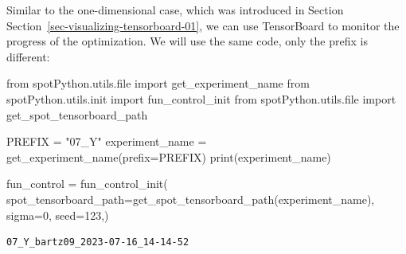 \documentclass[
  letterpaper,
  DIV=11,
  numbers=noendperiod]{scrreprt}
\newenvironment{Shaded}{\begin{snugshade}}{\end{snugshade}}
\newcommand{\BuiltInTok}[1]{\textcolor[rgb]{0.00,0.23,0.31}{#1}}
\newcommand{\DecValTok}[1]{\textcolor[rgb]{0.68,0.00,0.00}{#1}}
\newcommand{\ImportTok}[1]{\textcolor[rgb]{0.00,0.46,0.62}{#1}}
\newcommand{\NormalTok}[1]{\textcolor[rgb]{0.00,0.23,0.31}{#1}}
\newcommand{\OperatorTok}[1]{\textcolor[rgb]{0.37,0.37,0.37}{#1}}
\newcommand{\StringTok}[1]{\textcolor[rgb]{0.13,0.47,0.30}{#1}}
\begin{document}
\begin{tcolorbox}[enhanced jigsaw, titlerule=0mm, colbacktitle=quarto-callout-note-color!10!white, coltitle=black, arc=.35mm, toptitle=1mm, colback=white, left=2mm, opacityback=0, bottomtitle=1mm, bottomrule=.15mm, breakable, opacitybacktitle=0.6, colframe=quarto-callout-note-color-frame, rightrule=.15mm, toprule=.15mm, leftrule=.75mm, title=\textcolor{quarto-callout-note-color}{\faInfo}\hspace{0.5em}{TensorBoard}]

Similar to the one-dimensional case, which was introduced in Section
Section~\ref{sec-visualizing-tensorboard-01}, we can use TensorBoard to
monitor the progress of the optimization. We will use the same code,
only the prefix is different:

\begin{Shaded}
\begin{Highlighting}[]
\ImportTok{from}\NormalTok{ spotPython.utils.}\BuiltInTok{file} \ImportTok{import}\NormalTok{ get\_experiment\_name}
\ImportTok{from}\NormalTok{ spotPython.utils.init }\ImportTok{import}\NormalTok{ fun\_control\_init}
\ImportTok{from}\NormalTok{ spotPython.utils.}\BuiltInTok{file} \ImportTok{import}\NormalTok{ get\_spot\_tensorboard\_path}

\NormalTok{PREFIX }\OperatorTok{=} \StringTok{"07\_Y"}
\NormalTok{experiment\_name }\OperatorTok{=}\NormalTok{ get\_experiment\_name(prefix}\OperatorTok{=}\NormalTok{PREFIX)}
\BuiltInTok{print}\NormalTok{(experiment\_name)}

\NormalTok{fun\_control }\OperatorTok{=}\NormalTok{ fun\_control\_init(}
\NormalTok{    spot\_tensorboard\_path}\OperatorTok{=}\NormalTok{get\_spot\_tensorboard\_path(experiment\_name),}
\NormalTok{    sigma}\OperatorTok{=}\DecValTok{0}\NormalTok{,}
\NormalTok{    seed}\OperatorTok{=}\DecValTok{123}\NormalTok{,)}
\end{Highlighting}
\end{Shaded}

\begin{verbatim}
07_Y_bartz09_2023-07-16_14-14-52
\end{verbatim}

\end{tcolorbox}
\end{document}
